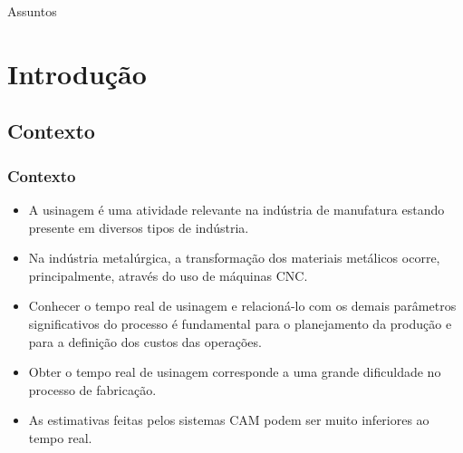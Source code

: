 \documentclass[aspectratio=169]{beamer}
\begin{document}
{%
\begin{frame}{Assuntos}
  \tableofcontents
\end{frame}


\section{Introdução}

\subsection{Contexto}

\begin{frame}
  \frametitle{Contexto}

  \begin{itemize}
    \item A usinagem \'e uma atividade relevante na ind\'ustria de 
          manufatura estando presente em diversos tipos de indústria.
    \item Na ind\'ustria metal\'urgica, a transforma\c c\~ao 
          dos materiais met\'alicos ocorre, principalmente, atrav\'es 
          do uso de m\'aquinas CNC.
    \item Conhecer o tempo real de usinagem e relacioná-lo com os demais 
          parâmetros significativos do processo é fundamental para o 
          planejamento da produção e para a definição dos custos das 
          operações.
    \item Obter o tempo real de usinagem corresponde a uma grande 
          dificuldade no processo de fabricação.
    \item As estimativas feitas pelos sistemas CAM podem ser muito 
          inferiores ao tempo real.
  \end{itemize}


\end{frame}}
\end{document}
